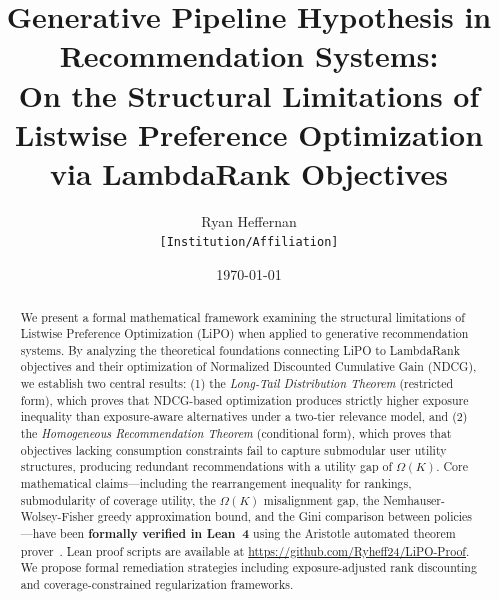 \documentclass[11pt,a4paper]{article}
\theoremstyle{definition}
\theoremstyle{plain}
\theoremstyle{remark}
\begin{document}
\title{%
    \textbf{Generative Pipeline Hypothesis in Recommendation Systems:}\\[0.5em]
    \Large On the Structural Limitations of Listwise Preference Optimization\\
    via LambdaRank Objectives
}
\author{
    Ryan Heffernan\\
    \small \texttt{[Institution/Affiliation]}
}
\date{\today}

\maketitle

\begin{abstract}
We present a formal mathematical framework examining the structural limitations of Listwise Preference Optimization (LiPO) when applied to generative recommendation systems. By analyzing the theoretical foundations connecting LiPO to LambdaRank objectives and their optimization of Normalized Discounted Cumulative Gain (NDCG), we establish two central results: (1) the \textit{Long-Tail Distribution Theorem} (restricted form), which proves that NDCG-based optimization produces strictly higher exposure inequality than exposure-aware alternatives under a two-tier relevance model, and (2) the \textit{Homogeneous Recommendation Theorem} (conditional form), which proves that objectives lacking consumption constraints fail to capture submodular user utility structures, producing redundant recommendations with a utility gap of $\Omega(K)$. Core mathematical claims---including the rearrangement inequality for rankings, submodularity of coverage utility, the $\Omega(K)$ misalignment gap, the Nemhauser-Wolsey-Fisher greedy approximation bound, and the Gini comparison between policies---have been \textbf{formally verified in Lean~4} using the Aristotle automated theorem prover~\cite{aristotle2025}. Lean proof scripts are available at \url{https://github.com/Ryheff24/LiPO-Proof}. We propose formal remediation strategies including exposure-adjusted rank discounting and coverage-constrained regularization frameworks.
\end{abstract}

\tableofcontents
\newpage
\end{document}
